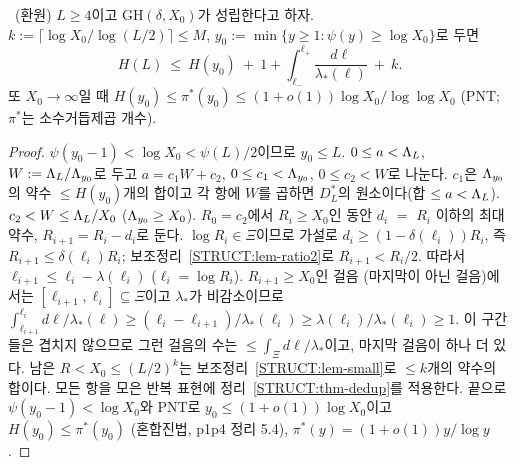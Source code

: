 \begin{theorem}\label{STRUCT:thm-greedy}
\PROVED\ (환원) $L\ge4$이고 $\mathrm{GH}(\delta,X_0)$가 성립한다고 하자. $k:=\lceil\log X_0/\log(L/2)\rceil\le M$, $y_0:=\min\{y\ge1:\psi(y)\ge\log X_0\}$로 두면
\[
H(L)\ \le\ H(y_0)\ +\ 1+\int_{\ell_-}^{\ell_+}\frac{d\ell}{\lambda_*(\ell)}\ +\ k .
\]
또 $X_0\to\infty$일 때 $H(y_0)\le\pi^*(y_0)\le(1+o(1))\log X_0/\log\log X_0$ (PNT; $\pi^*$는 소수거듭제곱 개수).
\end{theorem}
\begin{proof}
$\psi(y_0-1)<\log X_0<\psi(L)/2$이므로 $y_0\le L$. $0\le a<\Lambda_L$, $W:=\Lambda_L/\Lambda_{y_0}$로 두고 $a=c_1W+c_2$, $0\le c_1<\Lambda_{y_0}$, $0\le c_2<W$로 나눈다. $c_1$은 $\Lambda_{y_0}$의 약수 $\le H(y_0)$개의 합이고 각 항에 $W$를 곱하면 $D^*_L$의 원소이다(합 $\le a<\Lambda_L$).
$c_2<W\le\Lambda_L/X_0$ ($\Lambda_{y_0}\ge X_0$). $R_0=c_2$에서 $R_i\ge X_0$인 동안 $d_i$ $=$ $R_i$ 이하의 최대 약수, $R_{i+1}=R_i-d_i$로 둔다. $\log R_i\in\Xi$이므로 가설로 $d_i\ge(1-\delta(\ell_i))R_i$, 즉 $R_{i+1}\le\delta(\ell_i)R_i$; 보조정리~\ref{STRUCT:lem-ratio2}로 $R_{i+1}<R_i/2$. 따라서 $\ell_{i+1}\le\ell_i-\lambda(\ell_i)$ ($\ell_i=\log R_i$).
$R_{i+1}\ge X_0$인 걸음 (마지막이 아닌 걸음)에서는 $[\ell_{i+1},\ell_i]\subseteq\Xi$이고 $\lambda_*$가 비감소이므로
$\int_{\ell_{i+1}}^{\ell_i}d\ell/\lambda_*(\ell)\ge(\ell_i-\ell_{i+1})/\lambda_*(\ell_i)\ge\lambda(\ell_i)/\lambda_*(\ell_i)\ge1$. 이 구간들은 겹치지 않으므로 그런 걸음의 수는 $\le\int_\Xi d\ell/\lambda_*$이고, 마지막 걸음이 하나 더 있다.
남은 $R<X_0\le(L/2)^k$는 보조정리~\ref{STRUCT:lem-small}로 $\le k$개의 약수의 합이다. 모든 항을 모은 반복 표현에 정리~\ref{STRUCT:thm-dedup}를 적용한다.
끝으로 $\psi(y_0-1)<\log X_0$와 PNT로 $y_0\le(1+o(1))\log X_0$이고 $H(y_0)\le\pi^*(y_0)$ (혼합진법, p1p4 정리 5.4), $\pi^*(y)=(1+o(1))y/\log y$.
\end{proof}

